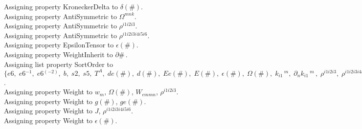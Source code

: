\documentclass[11pt]{article}
\begin{document}
Assigning property KroneckerDelta to $\delta(\#)$.
\\
Assigning property AntiSymmetric to ${\Omega}^{m n k}$.
\\
Assigning property AntiSymmetric to ${\rho}^{i1 i2 i3}$.
\\
Assigning property AntiSymmetric to ${\rho}^{i1 i2 i3 i4 i5 i6}$.
\\
Assigning property EpsilonTensor to $\epsilon(\#)$.
\\
Assigning property WeightInherit to $\partial{\#}\, $.
\\
Assigning list property SortOrder to $\{e6,\; e6{}^{-1},\; e6{}^{(-2)},\; b,\; s2,\; s5,\; {T}^{A},\; de(\#),\; d(\#),\; Ee(\#),\; E(\#),\; \epsilon(\#),\; \Omega(\#),\; {k}_{i1}\,^{m},\; {\partial}_{n}{{k}_{i1}\,^{m}}\, ,\; {\rho}^{i1 i2 i3},\; {\rho}^{i1 i2 i3 i4 i5 i6}\}$.
\\
Assigning property Weight to ${w}_{m}$, $\Omega(\#)$, ${W}_{em m n}$, ${\rho}^{i1 i2 i3}$.
\\
Assigning property Weight to $g(\#)$, $ge(\#)$.
\\
Assigning property Weight to $J$, ${\rho}^{i1 i2 i3 i4 i5 i6}$.
\\
Assigning property Weight to $\epsilon(\#)$.
\\
\end{document}
